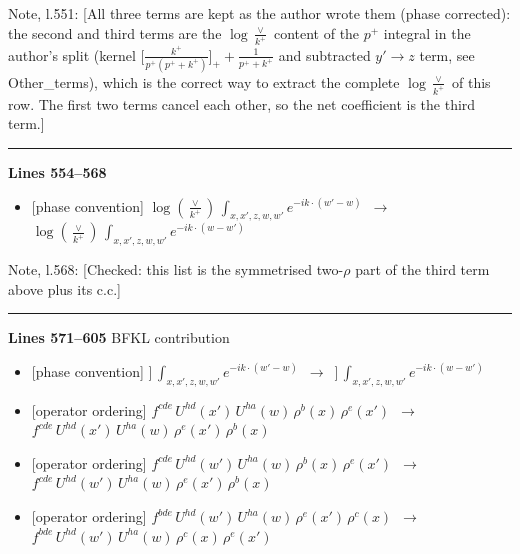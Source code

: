 \documentclass[10pt]{article}
\newenvironment{notebox}{\def\FrameCommand{{\color{notebar}\vrule width 1.5pt}\hspace{6pt}}\MakeFramed{\advance\hsize-\width\FrameRestore}\small}{\endMakeFramed}
\begin{document}
\begin{notebox}\textsf{\small Note, l.551:} [All three terms are kept as the author wrote them (phase corrected): the second and third terms are the $\log\frac{\vee}{k^{+}}$ content of the $p^{+}$ integral in the author's split (kernel $\big[\frac{k^{+}}{p^{+}(p^{+}+k^{+})}\big]_{+}+\frac{1}{p^{+}+k^{+}}$ and subtracted $y'\to z$ term, see Other\_terms), which is the correct way to extract the complete $\log\frac{\vee}{k^{+}}$ of this row. The first two terms cancel each other, so the net coefficient is the third term.]\end{notebox}
\noindent\rule{\linewidth}{0.3pt}\par\noindent\textbf{Lines 554--568} \par
\begin{itemize}[leftmargin=2.2em,itemsep=1pt,topsep=2pt]
\item[\textbf{l.554}] \textsf{\small [phase convention]} $\displaystyle \log{(\frac{\vee}{k^{+}})}\, \int_{x,x',z,w,w'}e^{-ik\cdot(w'-w)}$\ $\longrightarrow$\ $\displaystyle \log{(\frac{\vee}{k^{+}})}\, \int_{x,x',z,w,w'}e^{-ik\cdot(w-w')}$
\end{itemize}
\begin{notebox}\textsf{\small Note, l.568:} [Checked: this list is the symmetrised two-$\rho$ part of the third term above plus its c.c.]\end{notebox}
\noindent\rule{\linewidth}{0.3pt}\par\noindent\textbf{Lines 571--605} \quad \textsf{BFKL contribution} \par
\begin{itemize}[leftmargin=2.2em,itemsep=1pt,topsep=2pt]
\item[\textbf{l.571}] \textsf{\small [phase convention]} $\displaystyle \Big]\,\int_{x,x',z,w,w'}e^{-ik\cdot(w'-w)}$\ $\longrightarrow$\ $\displaystyle \Big]\,\int_{x,x',z,w,w'}e^{-ik\cdot(w-w')}$
\item[\textbf{l.579}] \textsf{\small [operator ordering]} $\displaystyle f^{cde}\,U^{hd}(x')\,U^{ha}(w)\,\rho^{b}(x)\,\rho^{e}(x')$\ $\longrightarrow$\ $\displaystyle f^{cde}\,U^{hd}(x')\,U^{ha}(w)\,\rho^{e}(x')\,\rho^{b}(x)$
\item[\textbf{l.581}] \textsf{\small [operator ordering]} $\displaystyle f^{cde}\,U^{hd}(w')\,U^{ha}(w)\,\rho^{b}(x)\,\rho^{e}(x')$\ $\longrightarrow$\ $\displaystyle f^{cde}\,U^{hd}(w')\,U^{ha}(w)\,\rho^{e}(x')\,\rho^{b}(x)$
\item[\textbf{l.594}] \textsf{\small [operator ordering]} $\displaystyle f^{bde}\,U^{hd}(w')\,U^{ha}(w)\,\rho^{e}(x')\,\rho^{c}(x)$\ $\longrightarrow$\ $\displaystyle f^{bde}\,U^{hd}(w')\,U^{ha}(w)\,\rho^{c}(x)\,\rho^{e}(x')$
\end{itemize}
\end{document}
